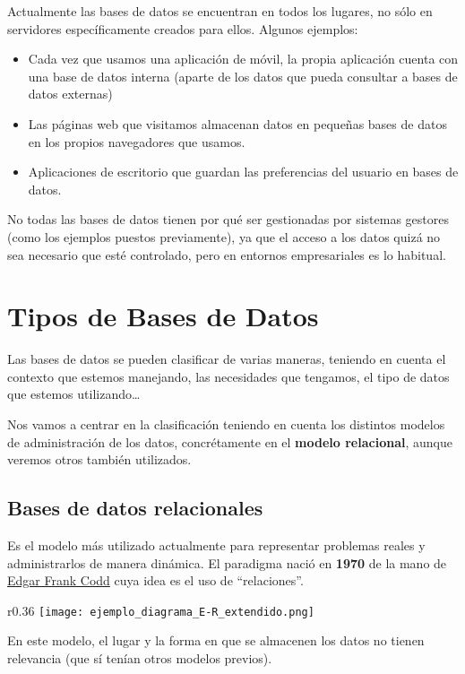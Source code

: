 Actualmente las bases de datos se encuentran en todos los lugares, no sólo en servidores específicamente creados para ellos. Algunos ejemplos:

\begin{itemize}
    \item Cada vez que usamos una aplicación de móvil, la propia aplicación cuenta con una base de datos interna (aparte de los datos que pueda consultar a bases de datos externas)
    \item Las páginas web que visitamos almacenan datos en pequeñas bases de datos en los propios navegadores que usamos.
    \item Aplicaciones de escritorio que guardan las preferencias del usuario en bases de datos.
\end{itemize}


No todas las bases de datos tienen por qué ser gestionadas por sistemas gestores (como los ejemplos puestos previamente), ya que el acceso a los datos quizá no sea necesario que esté controlado, pero en entornos empresariales es lo habitual.

\section{Tipos de Bases de Datos}
Las bases de datos se pueden clasificar de varias maneras, teniendo en cuenta el contexto que estemos manejando, las necesidades que tengamos, el tipo de datos que estemos utilizando…

Nos vamos a centrar en la clasificación teniendo en cuenta los distintos modelos de administración de los datos, concrétamente en el \textbf{modelo relacional}, aunque veremos otros también utilizados.


\subsection{Bases de datos relacionales}
Es el modelo más utilizado actualmente para representar problemas reales y administrarlos de manera dinámica. El paradigma nació en \textbf{1970} de la mano de \href{https://es.wikipedia.org/wiki/Edgar_Frank_Codd}{Edgar Frank Codd} cuya idea es el uso de “relaciones”.

\begin{wrapfigure}{r}{0.36\linewidth}
    \centering
    \vspace{-15pt}
    \texttt{[image: ejemplo\_diagrama\_E-R\_extendido.png]}
    \vspace{-30pt}
    \vspace{-30pt}
\end{wrapfigure}
En este modelo, el lugar y la forma en que se almacenen los datos no tienen relevancia (que sí tenían otros modelos previos).

